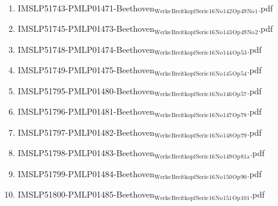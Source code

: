 \documentclass[11pt]{article}
\begin{document}
\begin{enumerate}
\begin{enumerate}
\begin{enumerate}
\item IMSLP51743-PMLP01471-Beethoven$_{\text{Werke}}$$_{\text{Breitkopf}}$$_{\text{Serie}}$$_{\text{16}}$$_{\text{No}}$$_{\text{142}}$$_{\text{Op}}$$_{\text{49}}$$_{\text{No}}$$_{\text{1}}$.pdf
\label{sec-1-1-1-1-44-9-6-7-70}

\item IMSLP51745-PMLP01473-Beethoven$_{\text{Werke}}$$_{\text{Breitkopf}}$$_{\text{Serie}}$$_{\text{16}}$$_{\text{No}}$$_{\text{143}}$$_{\text{Op}}$$_{\text{49}}$$_{\text{No}}$$_{\text{2}}$.pdf
\label{sec-1-1-1-1-44-9-6-7-71}

\item IMSLP51748-PMLP01474-Beethoven$_{\text{Werke}}$$_{\text{Breitkopf}}$$_{\text{Serie}}$$_{\text{16}}$$_{\text{No}}$$_{\text{144}}$$_{\text{Op}}$$_{\text{53}}$.pdf
\label{sec-1-1-1-1-44-9-6-7-72}

\item IMSLP51749-PMLP01475-Beethoven$_{\text{Werke}}$$_{\text{Breitkopf}}$$_{\text{Serie}}$$_{\text{16}}$$_{\text{No}}$$_{\text{145}}$$_{\text{Op}}$$_{\text{54}}$.pdf
\label{sec-1-1-1-1-44-9-6-7-73}

\item IMSLP51795-PMLP01480-Beethoven$_{\text{Werke}}$$_{\text{Breitkopf}}$$_{\text{Serie}}$$_{\text{16}}$$_{\text{No}}$$_{\text{146}}$$_{\text{Op}}$$_{\text{57}}$.pdf
\label{sec-1-1-1-1-44-9-6-7-74}

\item IMSLP51796-PMLP01481-Beethoven$_{\text{Werke}}$$_{\text{Breitkopf}}$$_{\text{Serie}}$$_{\text{16}}$$_{\text{No}}$$_{\text{147}}$$_{\text{Op}}$$_{\text{78}}$.pdf
\label{sec-1-1-1-1-44-9-6-7-75}

\item IMSLP51797-PMLP01482-Beethoven$_{\text{Werke}}$$_{\text{Breitkopf}}$$_{\text{Serie}}$$_{\text{16}}$$_{\text{No}}$$_{\text{148}}$$_{\text{Op}}$$_{\text{79}}$.pdf
\label{sec-1-1-1-1-44-9-6-7-76}

\item IMSLP51798-PMLP01483-Beethoven$_{\text{Werke}}$$_{\text{Breitkopf}}$$_{\text{Serie}}$$_{\text{16}}$$_{\text{No}}$$_{\text{149}}$$_{\text{Op}}$$_{\text{81a}}$.pdf
\label{sec-1-1-1-1-44-9-6-7-77}

\item IMSLP51799-PMLP01484-Beethoven$_{\text{Werke}}$$_{\text{Breitkopf}}$$_{\text{Serie}}$$_{\text{16}}$$_{\text{No}}$$_{\text{150}}$$_{\text{Op}}$$_{\text{90}}$.pdf
\label{sec-1-1-1-1-44-9-6-7-78}

\item IMSLP51800-PMLP01485-Beethoven$_{\text{Werke}}$$_{\text{Breitkopf}}$$_{\text{Serie}}$$_{\text{16}}$$_{\text{No}}$$_{\text{151}}$$_{\text{Op}}$$_{\text{101}}$.pdf
\label{sec-1-1-1-1-44-9-6-7-79}


\end{enumerate}
\end{enumerate}
\end{enumerate}
\end{document}
